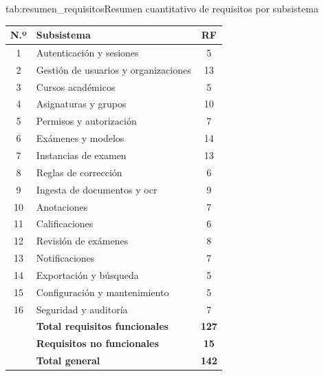 \begin{table}{tab:resumen_requisitos}{Resumen cuantitativo de requisitos por subsistema}
    \begin{tabular}{clc}
        \hline
        \textbf{N.º} & \textbf{Subsistema}                         & \textbf{RF} \\
        \hline
        1  & Autenticación y sesiones                              & 5  \\
        2  & Gestión de usuarios y organizaciones                  & 13 \\
        3  & Cursos académicos                                     & 5  \\
        4  & Asignaturas y grupos                                  & 10 \\
        5  & Permisos y autorización                               & 7  \\
        6  & Exámenes y modelos                                    & 14 \\
        7  & Instancias de examen                                  & 13 \\
        8  & Reglas de corrección                                  & 6  \\
        9  & Ingesta de documentos y \acs{ocr}                     & 9  \\
        10 & Anotaciones                                           & 7  \\
        11 & Calificaciones                                        & 6  \\
        12 & Revisión de exámenes                                  & 8  \\
        13 & Notificaciones                                        & 7  \\
        14 & Exportación y búsqueda                                & 5  \\
        15 & Configuración y mantenimiento                         & 5  \\
        16 & Seguridad y auditoría                                 & 7  \\
        \hline
           & \textbf{Total requisitos funcionales}                 & \textbf{127} \\
           & \textbf{Requisitos no funcionales}                    & \textbf{15}  \\
        \hline
           & \textbf{Total general}                                & \textbf{142} \\
        \hline
    \end{tabular}
\end{table}

